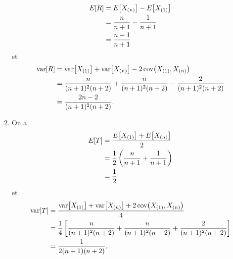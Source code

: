 \begin{solution}{1.22}
\begin{enumerate}
\begin{align*}
           E\! \left[ R \right] &= E\! \left[ X_{(n)} \right] - E\! \left[ X_{(1)} \right]\\
           &= \frac{n}{n+1} - \frac{1}{n+1}\\
           &= \frac{n-1}{n+1}
         \end{align*}
         et
         \begin{align*}
           \mathrm{var}\! \left[ R \right] &= \mathrm{var}\! \left[ X_{(1)} \right] + \mathrm{var}\! \left[ X_{(n)} \right] -
           2\, \mathrm{cov}\! \left( X_{(1)}, X_{(n)} \right)\\
           &= \frac{n}{(n+1)^2(n+2)} + \frac{n}{(n+1)^2(n+2)} -
           \frac{2}{(n+1)^2(n+2)} \\
           &=\frac{2n-2}{(n+1)^2(n+2)}.
         \end{align*}
       \item On a
         \begin{align*}
           E\! \left[ T \right] &= \frac{E\! \left[ X_{(1)} \right] + E\! \left[ X_{(n)} \right]}{2}\\
           &= \frac{1}{2}\left(\frac{n}{n+1} + \frac{1}{n+1}\right)\\
           &= \frac{1}{2}
         \end{align*}
         et
         \begin{align*}
           \mathrm{var}\! \left[ T \right] &= \frac{\mathrm{var}\! \left[ X_{(1)} \right]+\mathrm{var}\! \left[ X_{(n)} \right] +
             2\,\mathrm{cov}\! \left( X_{(1)}, X_{(n)} \right)}{4}\\
           &= \frac{1}{4}
           \left[
             \frac{n}{(n+1)^2(n+2)} +
             \frac{n}{(n+1)^2(n+2)} +
             \frac{2}{(n+1)^2(n+2)}
           \right] \\
           &= \frac{1}{2(n+1)(n+2)}.
         \end{align*}
       \end{enumerate}
   
\end{solution}
